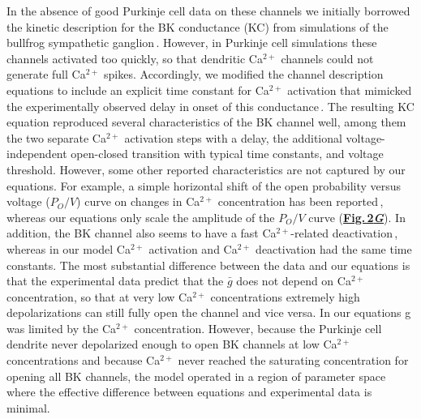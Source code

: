 \documentclass[12pt]{article}
\begin{document}
In the absence of good Purkinje cell data on these channels
we initially borrowed the kinetic description for the BK
conductance (KC) from simulations of the bullfrog sympathetic
ganglion\,\cite{Yamada-W:1989bs}. However, in Purkinje
cell simulations these channels activated too quickly,
so that dendritic Ca$^{2+}$  channels could not generate full Ca$^{2+}$ 
spikes. Accordingly, we modified the channel description
equations to include an explicit time constant for Ca$^{2+}$ activation
that mimicked the experimentally observed delay in
onset of this conductance\,\cite{Ikemoto:1989lh}. The resulting
KC equation reproduced several characteristics of the
BK channel well, among them the two separate Ca$^{2+}$ activation
steps with a delay, the additional voltage-independent
open-closed transition with typical time constants,
and voltage threshold. However, some other reported characteristics
are not captured by our equations. For example,
a simple horizontal shift of the open probability versus voltage
($P_O/V$) curve on changes in Ca$^{2+}$ concentration has been
reported\,\cite{Gola:1990pi, Moczydlowski:1983qa}, 
whereas our equations only scale the amplitude of
the $P_O/V$ curve (\href{../pub-purkinje-deschutter1-conductance1-kc1/pub-purkinje-deschutter1-conductance1-kc1.tex}{\bf Fig.\,2{\it G}}). In addition, the BK channel also
seems to have a fast Ca$^{2+}$-related deactivation\,\cite{Ikemoto:1989lh}, 
whereas in our model Ca$^{2+}$ activation and Ca$^{2+}$ 
deactivation had the same time constants. The most substantial
difference between the data and our equations is
that the experimental data predict that the $\bar g$ does not depend
on Ca$^{2+}$ concentration, so that at very low Ca$^{2+}$ concentrations
extremely high depolarizations can still fully
open the channel and vice versa. In our equations g was
limited by the Ca$^{2+}$ concentration. However, because the
Purkinje cell dendrite never depolarized enough to open
BK channels at low Ca$^{2+}$ concentrations and because Ca$^{2+}$ 
never reached the saturating concentration for opening all
BK channels, the model operated in a region of parameter
space where the effective difference between equations and
experimental data is minimal.
\end{document}
